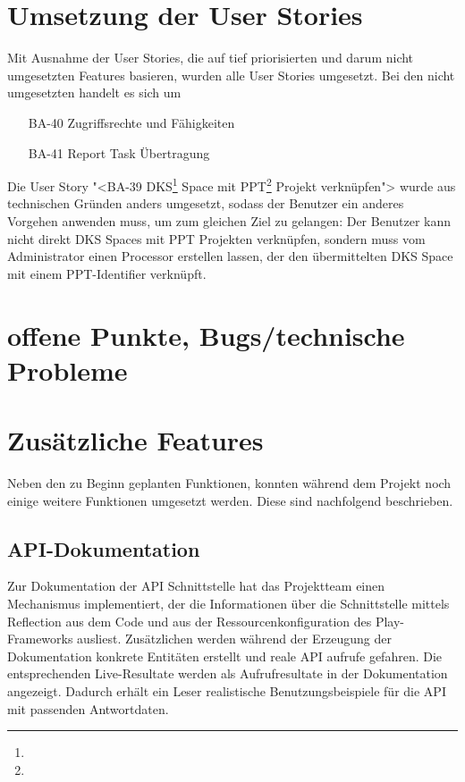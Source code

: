 			
	\section{Umsetzung der User Stories}
		Mit Ausnahme der User Stories, die auf tief priorisierten und darum nicht umgesetzten Features basieren, wurden alle User Stories umgesetzt.
		Bei den nicht umgesetzten handelt es sich um
		\begin{itemize}
			\item[BA-40] Zugriffsrechte und Fähigkeiten
			\item[BA-41] Report Task Übertragung
		\end{itemize}
		
		Die User Story "<BA-39 DKS\footnote{\dks} Space mit PPT\footnote{\ppt} Projekt verknüpfen"> wurde aus technischen Gründen anders umgesetzt, 
		sodass der Benutzer ein anderes Vorgehen anwenden muss, um zum gleichen Ziel zu gelangen: Der Benutzer kann nicht direkt DKS Spaces mit PPT Projekten verknüpfen, sondern muss vom Administrator einen Processor erstellen lassen, der den übermittelten DKS Space mit einem PPT-Identifier verknüpft.

	
	\section{offene Punkte, Bugs/technische Probleme}
	
	
	\section{Zusätzliche Features}
		Neben den zu Beginn geplanten Funktionen, konnten während dem Projekt noch einige weitere Funktionen umgesetzt werden.
		Diese sind nachfolgend beschrieben.
		\subsection{API-Dokumentation}
			Zur Dokumentation der API Schnittstelle hat das Projektteam
			einen Mechanismus implementiert, der die Informationen über die Schnittstelle mittels Reflection aus dem Code und aus der Ressourcenkonfiguration des Play-Frameworks ausliest.
			Zusätzlichen werden während der Erzeugung der Dokumentation konkrete Entitäten erstellt und reale API aufrufe gefahren.
			Die entsprechenden Live-Resultate werden als Aufrufresultate in der Dokumentation angezeigt.
			Dadurch erhält ein Leser realistische Benutzungsbeispiele für die API mit passenden Antwortdaten.
			
